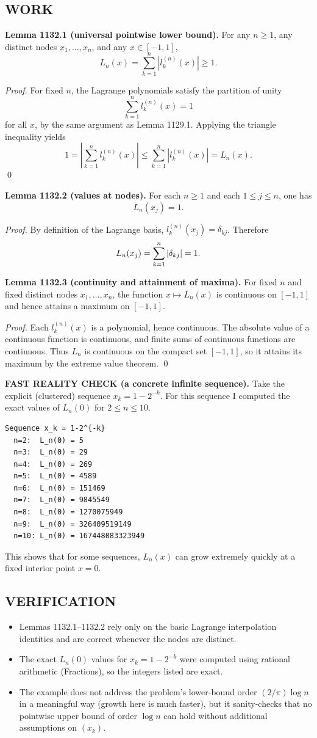 \subsection*{WORK}
\textbf{Lemma 1132.1 (universal pointwise lower bound).}
For any $n\ge 1$, any distinct nodes $x_1,\dots,x_n$, and any $x\in[-1,1]$,
\[
L_n(x)=\sum_{k=1}^n |l_k^{(n)}(x)|\ge 1.
\]

\emph{Proof.}
For fixed $n$, the Lagrange polynomials satisfy the partition of unity
\[
\sum_{k=1}^n l_k^{(n)}(x)=1
\]
for all $x$, by the same argument as Lemma 1129.1.
Applying the triangle inequality yields
\[
1=\left|\sum_{k=1}^n l_k^{(n)}(x)\right|\le \sum_{k=1}^n |l_k^{(n)}(x)|=L_n(x).
\]
\qed

\textbf{Lemma 1132.2 (values at nodes).}
For each $n\ge 1$ and each $1\le j\le n$, one has
\[
L_n(x_j)=1.
\]

\emph{Proof.}
By definition of the Lagrange basis, $l_k^{(n)}(x_j)=\delta_{kj}$.
Therefore
\[
L_n(x_j)=\sum_{k=1}^n |\delta_{kj}|=1.
\qedhere
\]

\textbf{Lemma 1132.3 (continuity and attainment of maxima).}
For fixed $n$ and fixed distinct nodes $x_1,\dots,x_n$, the function $x\mapsto L_n(x)$ is continuous on $[-1,1]$ and hence attains a maximum on $[-1,1]$.

\emph{Proof.}
Each $l_k^{(n)}(x)$ is a polynomial, hence continuous. The absolute value of a continuous function is continuous, and finite sums of continuous functions are continuous. Thus $L_n$ is continuous on the compact set $[-1,1]$, so it attains its maximum by the extreme value theorem.
\qed

\textbf{FAST REALITY CHECK (a concrete infinite sequence).}
Take the explicit (clustered) sequence $x_k=1-2^{-k}$.
For this sequence I computed the exact values of $L_n(0)$ for $2\le n\le 10$.
\begin{verbatim}
Sequence x_k = 1-2^{-k}
  n=2:  L_n(0) = 5
  n=3:  L_n(0) = 29
  n=4:  L_n(0) = 269
  n=5:  L_n(0) = 4589
  n=6:  L_n(0) = 151469
  n=7:  L_n(0) = 9845549
  n=8:  L_n(0) = 1270075949
  n=9:  L_n(0) = 326409519149
  n=10: L_n(0) = 167448083323949
\end{verbatim}
This shows that for some sequences, $L_n(x)$ can grow extremely quickly at a fixed interior point $x=0$.

\subsection*{VERIFICATION}
\begin{itemize}
\item Lemmas 1132.1--1132.2 rely only on the basic Lagrange interpolation identities and are correct whenever the nodes are distinct.
\item The exact $L_n(0)$ values for $x_k=1-2^{-k}$ were computed using rational arithmetic (Fractions), so the integers listed are exact.
\item The example does not address the problem's lower-bound order $(2/\pi)\log n$ in a meaningful way (growth here is much faster), but it sanity-checks that no pointwise upper bound of order $\log n$ can hold without additional assumptions on $(x_k)$.
\end{itemize}

